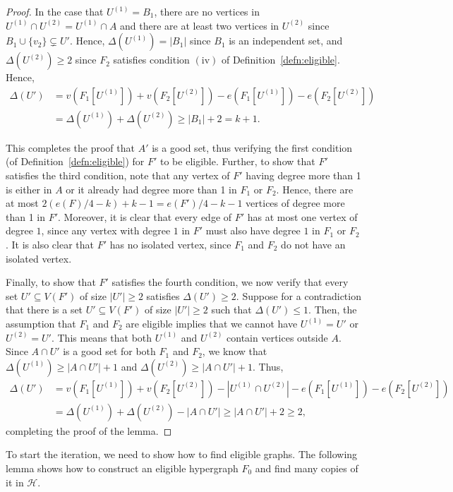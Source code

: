 \documentclass[11pt]{article}
\numberwithin{equation}{section}
\def\cH{\mathcal{H}}
\theoremstyle{plain}
\theoremstyle{remark}
\begin{document}
\begin{proof}
In the case that $U^{(1)}=B_1$, there are no vertices in $U^{(1)}\cap U^{(2)}=U^{(1)}\cap A$ and there are at least two vertices in $U^{(2)}$ since $B_1\cup \{v_2\}\subsetneq U'$. Hence, $\Delta(U^{(1)})=|B_1|$ since $B_1$ is an independent set, and $\Delta(U^{(2)})\geq 2$ since $F_2$ satisfies condition $\mathrm{(iv)}$ of Definition~\ref{defn:eligible}. Hence,
\begin{align*} \Delta(U') &=v(F_1[U^{(1)}])+v(F_2[U^{(2)}])-e(F_1[U^{(1)}])-e(F_2[U^{(2)}])\\
&=\Delta(U^{(1)})+\Delta(U^{(2)})\geq |B_1|+2=k+1.
\end{align*}

This completes the proof that $A'$ is a good set, thus verifying the first condition (of Definition~\ref{defn:eligible}) for $F'$ to be eligible. Further, to show that $F'$ satisfies the third condition, note that any vertex of $F'$ having degree more than 1 is either in $A$ or it already had degree more than 1 in $F_1$ or $F_2$. Hence, there are at most $2(e(F)/4-k)+k-1=e(F')/4-k-1$ vertices of degree more than 1 in $F'$. Moreover, it is clear that every edge of $F'$ has at most one vertex of degree $1$, since any vertex with degree $1$ in $F'$ must also have degree $1$ in $F_1$ or $F_2$. It is also clear that $F'$ has no isolated vertex, since $F_1$ and $F_2$ do not have an isolated vertex.

Finally, to show that $F'$ satisfies the fourth condition, we now verify that every set $U'\subseteq V(F')$ of size $|U'|\geq 2$ satisfies $\Delta(U')\geq 2$. Suppose for a contradiction that there is a set $U'\subseteq V(F')$ of size $|U'|\geq 2$ such that $\Delta(U')\leq 1$. Then, the assumption that $F_1$ and $F_2$ are eligible implies that we cannot have $U^{(1)}=U'$ or $U^{(2)}=U'$. This means that both $U^{(1)}$ and $U^{(2)}$ contain vertices outside $A$. Since $A\cap U'$ is a good set for both $F_1$ and $F_2$, we know that $\Delta(U^{(1)})\geq |A\cap U'|+1$ and $\Delta(U^{(2)})\geq |A\cap U'|+1$. Thus, 
\begin{align*}
    \Delta(U')&=v(F_1[U^{(1)}])+v(F_2[U^{(2)}])-|U^{(1)}\cap U^{(2)}|-e(F_1[U^{(1)}])-e(F_2[U^{(2)}])\\
    &=\Delta(U^{(1)})+\Delta(U^{(2)})-|A\cap U'|\geq |A\cap U'|+2\geq 2,
\end{align*}
completing the proof of the lemma.
\end{proof}

\noindent
To start the iteration, we need to show how to find eligible graphs. The following lemma shows how to construct an eligible hypergraph $F_0$ and find many copies of it in $\cH$.
\end{document}
